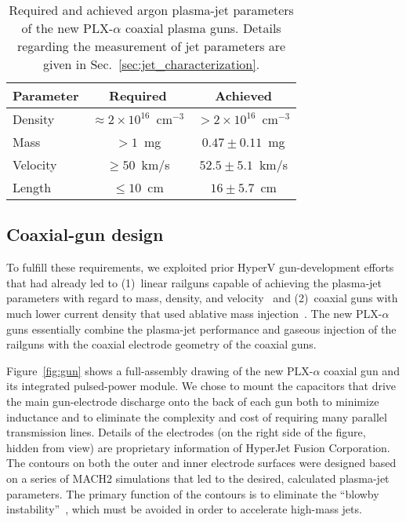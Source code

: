 \documentclass[journal]{IEEEtran}
\begin{document}
\begin{table}[!tb]
\renewcommand{\arraystretch}{1.2}
\caption{Required and achieved argon plasma-jet parameters of the new PLX-$\alpha$ coaxial
plasma guns.  Details regarding the measurement of jet parameters are given in
Sec.~\ref{sec:jet_characterization}.}
\label{table:jet_parameters}
\centering
\begin{tabular}{lcc}
\hline\hline
Parameter & Required & Achieved \\
\hline
Density & $\approx 2\times 10^{16}$~cm$^{-3}$ & $>2\times 10^{16}$~cm$^{-3}$\\
Mass & $>1$~mg & $0.47 \pm 0.11$~mg\\
Velocity & $\ge 50$~km/s & $52.5\pm 5.1$~km/s\\
Length & $\le 10$~cm & $16\pm 5.7$~cm\\
\hline\hline
\end{tabular}
\end{table}

\subsection{Coaxial-gun design}
\label{sec:gun_design}

To fulfill these requirements, we exploited prior HyperV gun-development efforts that had
already led to (1)~linear railguns capable of achieving the plasma-jet parameters with regard
to mass, density, and velocity~\cite{brockington12baps,hsu15jpp}
and (2)~coaxial guns with much lower current density that
used ablative mass injection~\cite{witherspoon09}.  The new PLX-$\alpha$ guns essentially combine
the plasma-jet
performance and gaseous injection of the railguns with the coaxial electrode geometry of
the coaxial guns.  

Figure~\ref{fig:gun} shows a full-assembly drawing of the new PLX-$\alpha$ coaxial gun and its
integrated pulsed-power module.  We chose to mount the capacitors that drive the
main gun-electrode discharge onto the back of each gun both to minimize inductance and to
eliminate the complexity and cost of requiring many parallel transmission lines.
Details of the electrodes (on the right side of the figure, hidden from view)
are proprietary information of HyperJet Fusion Corporation.
The contours on both the outer and inner electrode surfaces were designed
based on a series of MACH2 \cite{peterkin98}
simulations that led to the desired, calculated plasma-jet parameters.
The primary function of the contours is to eliminate the ``blowby instability''~\cite{cassibry06}, 
which must be avoided in order to accelerate high-mass jets.
\end{document}

